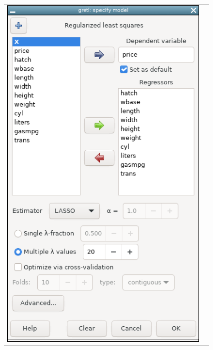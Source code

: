 \documentclass{article}
\begin{document}
\vspace{1ex}

\begin{figure}[htbp]
  \centering
  \begin{tabular}{cc}
    \includegraphics[scale=0.5]{regls_gui} &

\end{tabular}
\end{figure}
\end{document}
